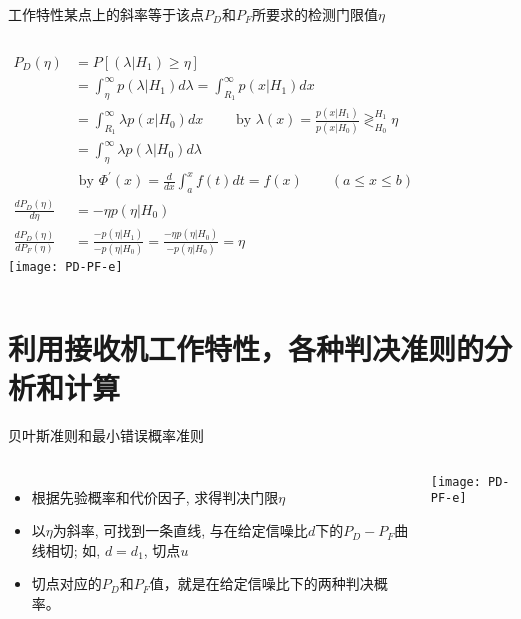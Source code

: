 \begin{frame}[shrink]{工作特性某点上的斜率等于该点$P_D$和$P_F$所要求的检测门限值$\eta$}
\begin{columns}[T]
	\small
	\begin{align*}
	P_D(\eta) &=P[(\lambda|H_1)\ge\eta]&\\
	&=\int_{\eta}^{\infty}p(\lambda|H_1)d\lambda=\int_{R_1}^{\infty}p(x|H_1)dx&\\
	&=\int_{R_1}^{\infty}\lambda p(x|H_0)dx \qquad \text{ by }\lambda(x)=\frac{p(x|H_1)}{p(x|H_0)}\mathop{\gtrless}_{H_0}^{H_1}\eta&\\
	&=\int_{\eta}^{\infty}\lambda p(\lambda|H_0)d\lambda&\\
	&\text{ by } \Phi^\prime(x)=\frac{d}{dx}\int_a^xf(t)dt=f(x)\qquad (a\le x\le b) \\
	\frac{dP_D(\eta)}{d\eta} &=-\eta p(\eta|H_0)\\
	\frac{dP_D(\eta)}{dP_F(\eta)} &=\frac{-p(\eta|H_1)}{-p(\eta|H_0)}=\frac{-\eta p(\eta|H_0)}{-p(\eta|H_0)}=\eta
	\end{align*}
	\texttt{[image: PD-PF-e]}
\end{columns}\end{frame}

\section{利用接收机工作特性，各种判决准则的分析和计算}

\begin{frame}[shrink]{贝叶斯准则和最小错误概率准则}
\begin{columns}[T]
		\begin{itemize}
		\item 根据先验概率和代价因子, 求得判决门限$\eta$
		\item 以$\eta$为斜率, 可找到一条直线, 与在给定信噪比$d$下的$P_D-P_F$曲线相切; 如, $d=d_1$, 切点$u$
		\item 切点对应的$P_D$和$P_F$值，就是在给定信噪比下的两种判决概率。
	\end{itemize}
	\texttt{[image: PD-PF-e]}
\end{columns}
\end{frame}

